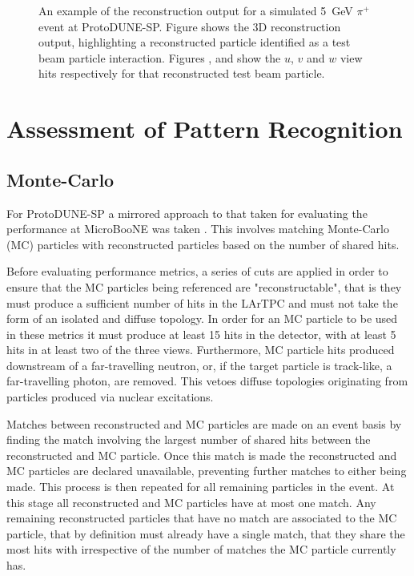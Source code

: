 \begin{figure}
\caption{An example of the reconstruction output for a simulated 5~GeV $\pi^{+}$ event at ProtoDUNE-SP.  Figure \protect{} shows the 3D reconstruction output, highlighting a reconstructed particle identified as a test beam particle interaction.  Figures \protect{}, \protect{} and \protect{} show the $u$, $v$ and $w$ view hits respectively for that reconstructed test beam particle.}
\label{fig:examplemcreco}
\end{figure}

\section{Assessment of Pattern Recognition}
\label{sec:assesmentpatrec}

\subsection{Monte-Carlo}
\label{sec:mcmetrics}
For ProtoDUNE-SP a mirrored approach to that taken for evaluating the performance at MicroBooNE was taken \cite{pandorauboone}.  This involves matching Monte-Carlo (MC) particles with reconstructed particles based on the number of shared hits.  

Before evaluating performance metrics, a series of cuts are applied in order to ensure that the MC particles being referenced are "reconstructable", that is they must produce a sufficient number of hits in the LArTPC and must not take the form of an isolated and diffuse topology.  In order for an MC particle to be used in these metrics it must produce at least 15 hits in the detector, with at least 5 hits in at least two of the three views.  Furthermore, MC particle hits produced downstream of a far-travelling neutron, or, if the target particle is track-like, a far-travelling photon, are removed.  This vetoes diffuse topologies originating from particles produced via nuclear excitations. 

Matches between reconstructed and MC particles are made on an event basis by finding the match involving the largest number of shared hits between the reconstructed and MC particle.  Once this match is made the reconstructed and MC particles are declared unavailable, preventing further matches to either being made.  This process is then repeated for all remaining particles in the event.  At this stage all reconstructed and MC particles have at most one match.  Any remaining reconstructed particles that have no match are associated to the MC particle, that by definition must already have a single match, that they share the most hits with irrespective of the number of matches the MC particle currently has.


